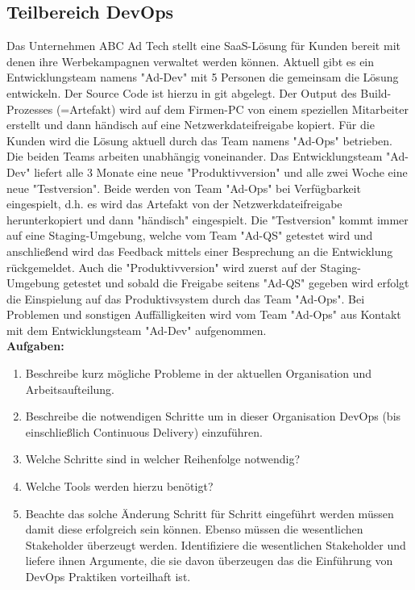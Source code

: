 \subsection{Teilbereich DevOps}

Das Unternehmen ABC Ad Tech stellt eine SaaS-Lösung für Kunden bereit mit denen ihre
Werbekampagnen verwaltet werden können.
Aktuell gibt es ein Entwicklungsteam namens "Ad-Dev" mit 5 Personen die gemeinsam die
Lösung entwickeln. Der Source Code ist hierzu in git abgelegt. Der Output des Build-Prozesses
(=Artefakt) wird auf dem Firmen-PC von einem speziellen Mitarbeiter erstellt und dann
händisch auf eine Netzwerkdateifreigabe kopiert.
Für die Kunden wird die Lösung aktuell durch das Team namens "Ad-Ops" betrieben.
Die beiden Teams arbeiten unabhängig voneinander.
Das Entwicklungsteam "Ad-Dev" liefert alle 3 Monate eine neue "Produktivversion" und alle
zwei Woche eine neue "Testversion". Beide werden von Team "Ad-Ops" bei Verfügbarkeit
eingespielt, d.h. es wird das Artefakt von der Netzwerkdateifreigabe herunterkopiert und dann
"händisch" eingespielt. Die "Testversion" kommt immer auf eine Staging-Umgebung, welche
vom Team "Ad-QS" getestet wird und anschließend wird das Feedback mittels einer
Besprechung an die Entwicklung rückgemeldet. Auch die "Produktivversion" wird zuerst auf der
Staging-Umgebung getestet und sobald die Freigabe seitens "Ad-QS" gegeben wird erfolgt die
Einspielung auf das Produktivsystem durch das Team "Ad-Ops". Bei Problemen und sonstigen
Auffälligkeiten wird vom Team "Ad-Ops" aus Kontakt mit dem Entwicklungsteam "Ad-Dev"
aufgenommen.\\

\textbf{Aufgaben:}
\begin{enumerate}
    \item Beschreibe kurz mögliche Probleme in der aktuellen Organisation und Arbeitsaufteilung.\\
    
    \item Beschreibe die notwendigen Schritte um in dieser Organisation DevOps (bis einschließlich
    Continuous Delivery) einzuführen. \\
    
    \item Welche Schritte sind in welcher Reihenfolge notwendig? \\
    
    \item Welche Tools werden hierzu benötigt? \\
    
    \item Beachte das solche Änderung Schritt für Schritt eingeführt werden müssen damit diese
    erfolgreich sein können. Ebenso müssen die wesentlichen Stakeholder überzeugt werden.
    Identifiziere die wesentlichen Stakeholder und liefere ihnen Argumente, die sie davon
    überzeugen das die Einführung von DevOps Praktiken vorteilhaft ist. \\

    
\end{enumerate}

\newpage


